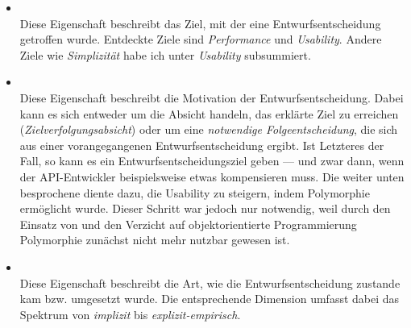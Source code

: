 \begin{itemize}
  \item[\codebullet{apiua://code/-9223372036854774864}] \textbf{} \\
  Diese Eigenschaft beschreibt das Ziel, mit der eine Entwurfsentscheidung getroffen wurde. Entdeckte Ziele sind \textit{Performance} und \textit{Usability}. Andere Ziele wie \textit{Simplizität} habe ich unter \textit{Usability} subsummiert.
  
  \item[\codebullet{apiua://code/-9223372036854774942}] \textbf{} \\
  Diese Eigenschaft beschreibt die Motivation der Entwurfsentscheidung. Dabei kann es sich entweder um die Absicht handeln, das erklärte Ziel zu erreichen (\textit{Zielverfolgungsabsicht}) oder um eine \textit{notwendige Folgeentscheidung}, die sich aus einer vorangegangenen Entwurfsentscheidung ergibt. Ist Letzteres der Fall, so kann es ein Entwurfsentscheidungsziel geben --- und zwar dann, wenn der API-Entwickler beispielsweise etwas kompensieren muss. Die weiter unten besprochene   diente dazu, die Usability zu steigern, indem Polymorphie ermöglicht wurde. Dieser Schritt war jedoch nur notwendig, weil durch den Einsatz von  und den Verzicht auf objektorientierte Programmierung Polymorphie zunächst nicht mehr nutzbar gewesen ist. 
  
  \item[\codebullet{apiua://code/-9223372036854774839}] \textbf{} \\
  Diese Eigenschaft beschreibt die Art, wie die Entwurfsentscheidung zustande kam bzw. umgesetzt wurde. Die entsprechende Dimension umfasst dabei das Spektrum von \textit{implizit} bis \textit{explizit-empirisch}.
  

\end{itemize}
